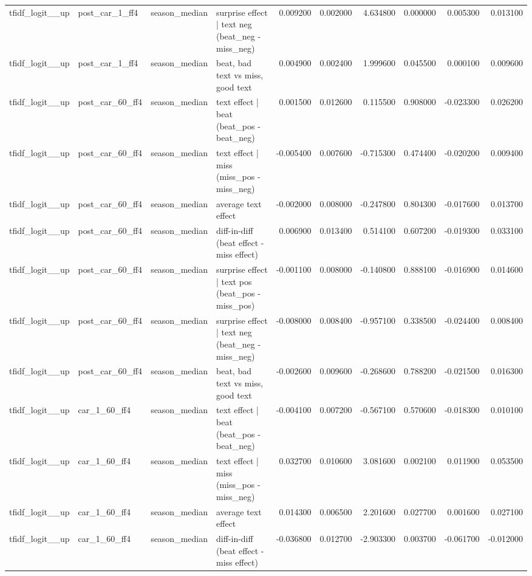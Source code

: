 \begin{table}
\begin{tabular}{llllrrrrrr}
tfidf\_logit\_\_up & post\_car\_1\_ff4 & season\_median & surprise effect | text neg (beat\_neg - miss\_neg) & 0.009200 & 0.002000 & 4.634800 & 0.000000 & 0.005300 & 0.013100 \\
tfidf\_logit\_\_up & post\_car\_1\_ff4 & season\_median & beat, bad text vs miss, good text & 0.004900 & 0.002400 & 1.999600 & 0.045500 & 0.000100 & 0.009600 \\
tfidf\_logit\_\_up & post\_car\_60\_ff4 & season\_median & text effect | beat  (beat\_pos - beat\_neg) & 0.001500 & 0.012600 & 0.115500 & 0.908000 & -0.023300 & 0.026200 \\
tfidf\_logit\_\_up & post\_car\_60\_ff4 & season\_median & text effect | miss  (miss\_pos - miss\_neg) & -0.005400 & 0.007600 & -0.715300 & 0.474400 & -0.020200 & 0.009400 \\
tfidf\_logit\_\_up & post\_car\_60\_ff4 & season\_median & average text effect & -0.002000 & 0.008000 & -0.247800 & 0.804300 & -0.017600 & 0.013700 \\
tfidf\_logit\_\_up & post\_car\_60\_ff4 & season\_median & diff-in-diff (beat effect - miss effect) & 0.006900 & 0.013400 & 0.514100 & 0.607200 & -0.019300 & 0.033100 \\
tfidf\_logit\_\_up & post\_car\_60\_ff4 & season\_median & surprise effect | text pos (beat\_pos - miss\_pos) & -0.001100 & 0.008000 & -0.140800 & 0.888100 & -0.016900 & 0.014600 \\
tfidf\_logit\_\_up & post\_car\_60\_ff4 & season\_median & surprise effect | text neg (beat\_neg - miss\_neg) & -0.008000 & 0.008400 & -0.957100 & 0.338500 & -0.024400 & 0.008400 \\
tfidf\_logit\_\_up & post\_car\_60\_ff4 & season\_median & beat, bad text vs miss, good text & -0.002600 & 0.009600 & -0.268600 & 0.788200 & -0.021500 & 0.016300 \\
tfidf\_logit\_\_up & car\_1\_60\_ff4 & season\_median & text effect | beat  (beat\_pos - beat\_neg) & -0.004100 & 0.007200 & -0.567100 & 0.570600 & -0.018300 & 0.010100 \\
tfidf\_logit\_\_up & car\_1\_60\_ff4 & season\_median & text effect | miss  (miss\_pos - miss\_neg) & 0.032700 & 0.010600 & 3.081600 & 0.002100 & 0.011900 & 0.053500 \\
tfidf\_logit\_\_up & car\_1\_60\_ff4 & season\_median & average text effect & 0.014300 & 0.006500 & 2.201600 & 0.027700 & 0.001600 & 0.027100 \\
tfidf\_logit\_\_up & car\_1\_60\_ff4 & season\_median & diff-in-diff (beat effect - miss effect) & -0.036800 & 0.012700 & -2.903300 & 0.003700 & -0.061700 & -0.012000 \\

\end{tabular}
\end{table}

